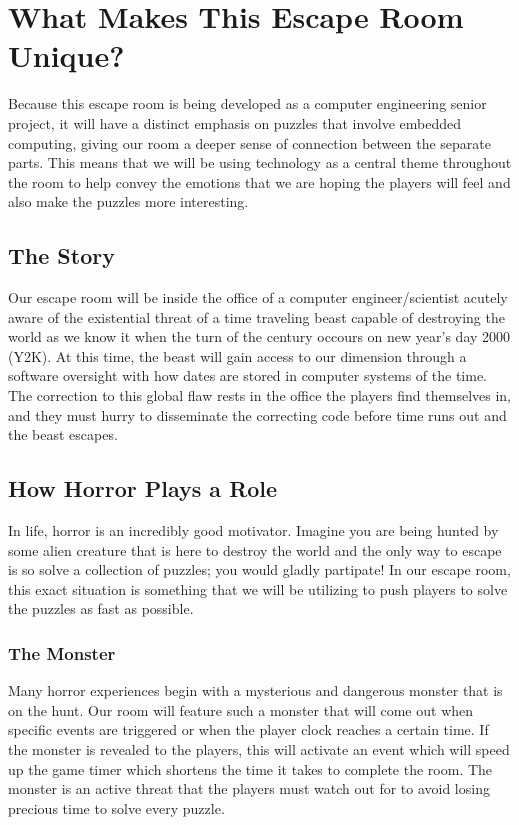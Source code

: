\documentclass[conference]{IEEEtran}
\begin{document}
\section{What Makes This Escape Room Unique?}
Because this escape room is being developed as a computer engineering senior project, it will have a distinct emphasis
on puzzles that involve embedded computing, giving our room a deeper sense of connection between the separate parts.
This means that we will be using technology as a central theme throughout the room to help convey the emotions that we
are hoping the players will feel and also make the puzzles more interesting.

\subsection*{The Story}
Our escape room will be inside the office of a computer engineer/scientist acutely aware of the existential threat
of a time traveling beast capable of destroying the world as we know it when the turn of the century occours on
new year's day 2000 (Y2K). At this time, the beast will gain access to our dimension through a software oversight
with how dates are stored in computer systems of the time. The correction to this global flaw rests in the office
the players find themselves in, and they must hurry to disseminate the correcting code before time runs out and the
beast escapes.

\subsection*{How Horror Plays a Role}
In life, horror is an incredibly good motivator. Imagine you are being hunted by some alien creature that is here to
destroy the world and the only way to escape is so solve a collection of puzzles; you would gladly partipate!
In our escape room, this exact situation is something that we will be utilizing to push players to solve the puzzles
as fast as possible.

\subsubsection*{The Monster}
Many horror experiences begin with a mysterious and dangerous monster that is on the hunt. Our room will feature such a monster
that will come out when specific events are triggered or when the player clock reaches a certain time.
If the monster is revealed to the players, this will activate an event which will
speed up the game timer which shortens the time it takes to complete the room. The monster is an
active threat that the players must watch out for to avoid losing precious time to
solve every puzzle.
\end{document}
